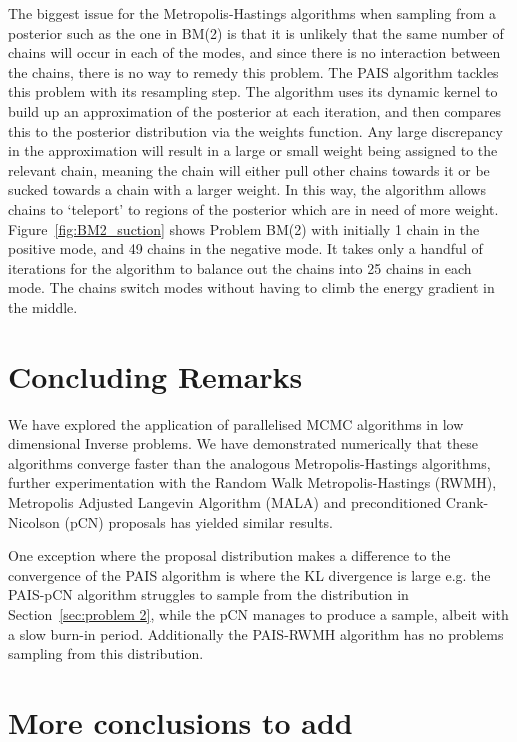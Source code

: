 \documentclass[final]{siamltex}
\begin{document}
The biggest issue for the Metropolis-Hastings algorithms when sampling from a posterior such as the one in BM(2) is that it is unlikely that the same number of chains will occur in each of the modes, and since there is no interaction between the chains, there is no way to remedy this problem. The PAIS algorithm tackles this problem with its resampling step. The algorithm uses its dynamic kernel to build up an approximation of the posterior at each iteration, and then compares this to the posterior distribution via the weights function. Any large discrepancy in the approximation will result in a large or small weight being assigned to the relevant chain, meaning the chain will either pull other chains towards it or be sucked towards a chain with a larger weight. In this way, the algorithm allows chains to `teleport' to regions of the posterior which are in need of more weight. Figure~\ref{fig:BM2_suction} shows Problem BM(2) with initially 1 chain in the positive mode, and 49 chains in the negative mode. It takes only a handful of iterations for the algorithm to balance out the chains into 25 chains in each mode. The chains switch modes without having to climb the energy gradient in the middle.

\section{Concluding Remarks}

We have explored the application of parallelised MCMC algorithms in low dimensional Inverse problems. We have demonstrated numerically that these algorithms converge faster than the analogous Metropolis-Hastings algorithms, further experimentation with the Random Walk Metropolis-Hastings (RWMH), Metropolis Adjusted Langevin Algorithm (MALA) and preconditioned Crank-Nicolson (pCN) proposals has yielded similar results.

One exception where the proposal distribution makes a difference to
the convergence of the PAIS algorithm is where the KL divergence is
large e.g. the PAIS-pCN algorithm struggles to sample from the
distribution in Section~\ref{sec:problem 2}, while the pCN manages to
produce a sample, albeit with a slow burn-in period. Additionally the
PAIS-RWMH algorithm has no problems sampling from this distribution.



\section{More conclusions to add}
\end{document}
